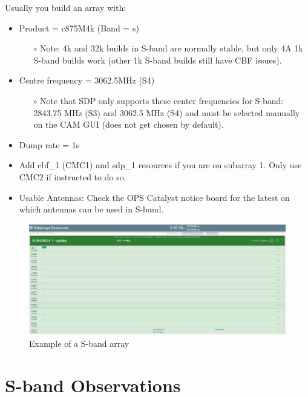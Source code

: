 Usually you build an array with:
\begin{itemize}
 

\item  Product = c875M4k (Band = s)
\begin{itemize}
\item[$\circ$]Note: 4k and 32k builds in S-band are normally stable, but only 4A 1k S-band builds work (other 1k S-band builds still have CBF issues).
\end{itemize}
\item  Centre frequency = 3062.5MHz (S4)
\begin{itemize}
\item[$\circ$] Note that SDP only supports these center frequencies for S-band: 2843.75 MHz (S3) and 3062.5 MHz (S4) and must be selected manually on the CAM GUI (does not get chosen by default).
\end{itemize}
\item Dump rate = 1s
\item Add cbf\_1 (CMC1) and sdp\_1 resources if you are on subarray 1. Only use CMC2 if instructed to do so.
\item Usable Antennas: Check the OPS Catalyst notice board for the latest on which antennas can be used in S-band.

\end{itemize}

\begin{figure}[!thb]
	\centering
	\includegraphics[scale=0.28]{Chapters/images/image113.png}
	
	\caption{Example of a S-band array}
	\label{fig:image113}
\end{figure}



\section{ S-band Observations}
